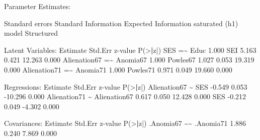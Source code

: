 \documentclass[
]{article}
\newenvironment{Shaded}{\begin{snugshade}}{\end{snugshade}}
\newcommand{\ErrorTok}[1]{\textcolor[rgb]{0.64,0.00,0.00}{\textbf{#1}}}
\newcommand{\FloatTok}[1]{\textcolor[rgb]{0.00,0.00,0.81}{#1}}
\newcommand{\FunctionTok}[1]{\textcolor[rgb]{0.00,0.00,0.00}{#1}}
\newcommand{\NormalTok}[1]{#1}
\newcommand{\OtherTok}[1]{\textcolor[rgb]{0.56,0.35,0.01}{#1}}
\newcommand{\SpecialCharTok}[1]{\textcolor[rgb]{0.00,0.00,0.00}{#1}}
\begin{document}
\begin{Shaded}
\begin{Highlighting}[]
\NormalTok{Parameter Estimates}\SpecialCharTok{:}

\NormalTok{  Standard errors                             Standard}
\NormalTok{  Information                                 Expected}
\NormalTok{  Information }\FunctionTok{saturated}\NormalTok{ (h1) model          Structured}

\NormalTok{Latent Variables}\SpecialCharTok{:}
\NormalTok{                   Estimate  Std.Err  z}\SpecialCharTok{{-}}\NormalTok{value  }\FunctionTok{P}\NormalTok{(}\SpecialCharTok{\textgreater{}}\ErrorTok{|}\NormalTok{z}\SpecialCharTok{|}\NormalTok{)}
\NormalTok{  SES }\OtherTok{=}\ErrorTok{\textasciitilde{}}                                              
\NormalTok{    Educ              }\FloatTok{1.000}                           
\NormalTok{    SEI               }\FloatTok{5.163}    \FloatTok{0.421}   \FloatTok{12.263}    \FloatTok{0.000}
\NormalTok{  Alienation67 }\OtherTok{=}\ErrorTok{\textasciitilde{}}                                     
\NormalTok{    Anomia67          }\FloatTok{1.000}                           
\NormalTok{    Powles67          }\FloatTok{1.027}    \FloatTok{0.053}   \FloatTok{19.319}    \FloatTok{0.000}
\NormalTok{  Alienation71 }\OtherTok{=}\ErrorTok{\textasciitilde{}}                                     
\NormalTok{    Anomia71          }\FloatTok{1.000}                           
\NormalTok{    Powles71          }\FloatTok{0.971}    \FloatTok{0.049}   \FloatTok{19.660}    \FloatTok{0.000}

\NormalTok{Regressions}\SpecialCharTok{:}
\NormalTok{                   Estimate  Std.Err  z}\SpecialCharTok{{-}}\NormalTok{value  }\FunctionTok{P}\NormalTok{(}\SpecialCharTok{\textgreater{}}\ErrorTok{|}\NormalTok{z}\SpecialCharTok{|}\NormalTok{)}
\NormalTok{  Alienation67 }\SpecialCharTok{\textasciitilde{}}                                      
\NormalTok{    SES              }\SpecialCharTok{{-}}\FloatTok{0.549}    \FloatTok{0.053}  \SpecialCharTok{{-}}\FloatTok{10.296}    \FloatTok{0.000}
\NormalTok{  Alienation71 }\SpecialCharTok{\textasciitilde{}}                                      
\NormalTok{    Alienation67      }\FloatTok{0.617}    \FloatTok{0.050}   \FloatTok{12.428}    \FloatTok{0.000}
\NormalTok{    SES              }\SpecialCharTok{{-}}\FloatTok{0.212}    \FloatTok{0.049}   \SpecialCharTok{{-}}\FloatTok{4.302}    \FloatTok{0.000}

\NormalTok{Covariances}\SpecialCharTok{:}
\NormalTok{                   Estimate  Std.Err  z}\SpecialCharTok{{-}}\NormalTok{value  }\FunctionTok{P}\NormalTok{(}\SpecialCharTok{\textgreater{}}\ErrorTok{|}\NormalTok{z}\SpecialCharTok{|}\NormalTok{)}
\NormalTok{ .Anomia67 }\SpecialCharTok{\textasciitilde{}}\ErrorTok{\textasciitilde{}}                                         
\NormalTok{   .Anomia71          }\FloatTok{1.886}    \FloatTok{0.240}    \FloatTok{7.869}    \FloatTok{0.000}


\end{Highlighting}
\end{Shaded}
\end{document}
